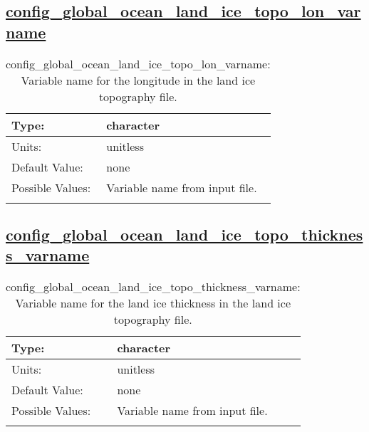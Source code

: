 \subsection[config\_global\_ocean\_land\_ice\_topo\_lon\_varname]{\hyperref[sec:nm_tab_global_ocean]{config\_global\_ocean\_land\_ice\_topo\_lon\_varname}}
\label{subsec:nm_sec_config_global_ocean_land_ice_topo_lon_varname}
\begin{center}
\begin{longtable}{| p{2.0in} || p{4.0in} |}
    \hline
    Type: & character \\
    \hline
    Units: & \si{unitless} \\
    \hline
    Default Value: & none \\
    \hline
    Possible Values: & Variable name from input file. \\
    \hline
    \caption{config\_global\_ocean\_land\_ice\_topo\_lon\_varname: Variable name for the longitude in the land ice topography file.}
\end{longtable}
\end{center}
\subsection[config\_global\_ocean\_land\_ice\_topo\_thickness\_varname]{\hyperref[sec:nm_tab_global_ocean]{config\_global\_ocean\_land\_ice\_topo\_thickness\_varname}}
\label{subsec:nm_sec_config_global_ocean_land_ice_topo_thickness_varname}
\begin{center}
\begin{longtable}{| p{2.0in} || p{4.0in} |}
    \hline
    Type: & character \\
    \hline
    Units: & \si{unitless} \\
    \hline
    Default Value: & none \\
    \hline
    Possible Values: & Variable name from input file. \\
    \hline
    \caption{config\_global\_ocean\_land\_ice\_topo\_thickness\_varname: Variable name for the land ice thickness in the land ice topography file.}
\end{longtable}
\end{center}
